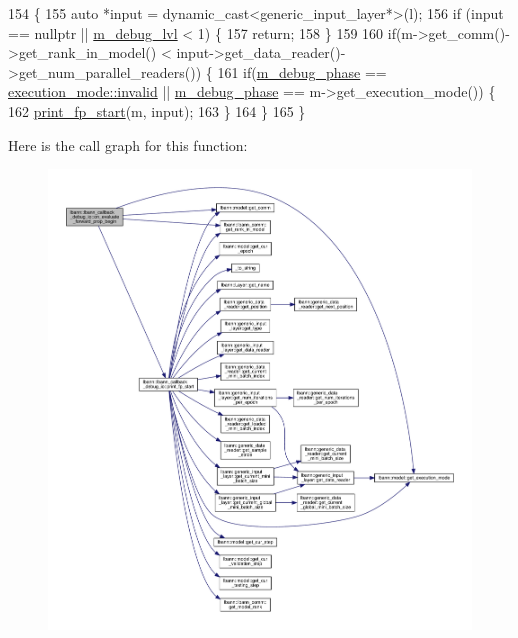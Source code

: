 \begin{DoxyCode}
154                                                                                     \{
155   \textcolor{keyword}{auto} *input = \textcolor{keyword}{dynamic\_cast<}generic\_input\_layer*\textcolor{keyword}{>}(l);
156   \textcolor{keywordflow}{if} (input == \textcolor{keyword}{nullptr} || \hyperlink{classlbann_1_1lbann__callback__debug__io_adfd537a09e80aaa0887e5226dc52c13c}{m\_debug\_lvl} < 1) \{
157     \textcolor{keywordflow}{return};
158   \}
159 
160   \textcolor{keywordflow}{if}(m->get\_comm()->get\_rank\_in\_model() < input->get\_data\_reader()->get\_num\_parallel\_readers()) \{
161     \textcolor{keywordflow}{if}(\hyperlink{classlbann_1_1lbann__callback__debug__io_add73fbc786ca9284fa3399a7e99d0b1f}{m\_debug\_phase} == \hyperlink{base_8hpp_a2781a159088df64ed7d47cc91c4dc0a8afedb2d84cafe20862cb4399751a8a7e3}{execution\_mode::invalid} || 
      \hyperlink{classlbann_1_1lbann__callback__debug__io_add73fbc786ca9284fa3399a7e99d0b1f}{m\_debug\_phase} == m->get\_execution\_mode()) \{
162       \hyperlink{classlbann_1_1lbann__callback__debug__io_a3c9897a583441381f82a11246aea4424}{print\_fp\_start}(m, input);
163     \}
164   \}
165 \}
\end{DoxyCode}
Here is the call graph for this function\+:\nopagebreak
\begin{figure}[H]
\begin{center}
\leavevmode
\includegraphics[width=350pt]{classlbann_1_1lbann__callback__debug__io_ac9b36fc36ab6faa9de44db026addf02a_cgraph}
\end{center}
\end{figure}
